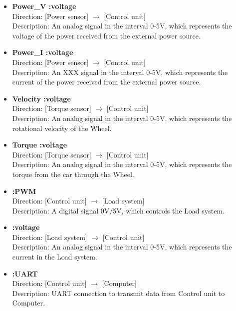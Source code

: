 \begin{itemize}
	\item \textbf{Power\_V :voltage}\\
		Direction: [Power sensor] $\rightarrow$ [Control unit]\\
		Description: An analog signal in the interval 0-5V, which represents the voltage of the power received from the external power source.
	\item \textbf{Power\_I :voltage}\\
		Direction: [Power sensor] $\rightarrow$ [Control unit]\\
		Description: An XXX signal in the interval 0-5V, which represents the current of the power received from the external power source.
	\item \textbf{Velocity :voltage}\\
		Direction: [Torque sensor] $\rightarrow$ [Control unit]\\
		Description: An analog signal in the interval 0-5V, which represents the rotational velocity of the Wheel.
	\item \textbf{Torque :voltage}\\
		Direction: [Torque sensor] $\rightarrow$ [Control unit]\\
		Description: An analog signal in the interval 0-5V, which represents the torque from the car through the Wheel.
	\item \textbf{:PWM}\\
		Direction: [Control unit] $\rightarrow$ [Load system]\\
		Description: A digital signal 0V/5V, which controls the Load system.
	\item \textbf{:voltage}\\
		Direction: [Load system] $\rightarrow$ [Control unit]\\
		Description: An analog signal in the interval 0-5V, which represents the current in the Load system.
	\item \textbf{:UART}\\
		Direction: [Control unit] $\rightarrow$ [Computer]\\
		Description: UART connection to transmit data from Control unit to Computer.
\end{itemize}
